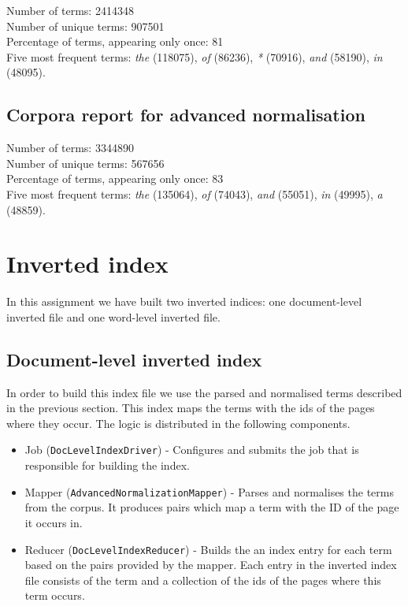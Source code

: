 \documentclass[a4paper, notitlepage]{report}
\begin{document}
Number of terms: 2414348\\
Number of unique terms: 907501\\
Percentage of terms, appearing only once: 81\\
Five most frequent terms: \emph{the} (118075), \emph{of} (86236), \emph{*} (70916), \emph{and} (58190), \emph{in} (48095).


\subsection{Corpora report for advanced normalisation}

Number of terms: 3344890\\
Number of unique terms: 567656\\
Percentage of terms, appearing only once: 83\\
Five most frequent terms: \emph{the} (135064), \emph{of} (74043), \emph{and} (55051), \emph{in} (49995), \emph{a} (48859).

\section{Inverted index}
In this assignment we have built two inverted indices: one document-level inverted file and one word-level inverted file.

\subsection{Document-level inverted index}
In order to build this index file we use the parsed and normalised terms described in the previous section. This index maps the terms with the ids of the pages where they occur. The logic is distributed in the following components.

\begin{itemize}
	\item Job (\lstinline{DocLevelIndexDriver}) - Configures and submits the job that is responsible for building the index.
	\item Mapper (\lstinline{AdvancedNormalizationMapper}) - Parses and normalises the terms from the corpus. It produces pairs which map a term with the ID of the page it occurs in.
	\item Reducer (\lstinline{DocLevelIndexReducer}) - Builds the an index entry for each term based on the pairs provided by the mapper. Each entry in the inverted index file consists of the term and a collection of the ids of the pages where this term occurs.  
\end{itemize}
\end{document}
